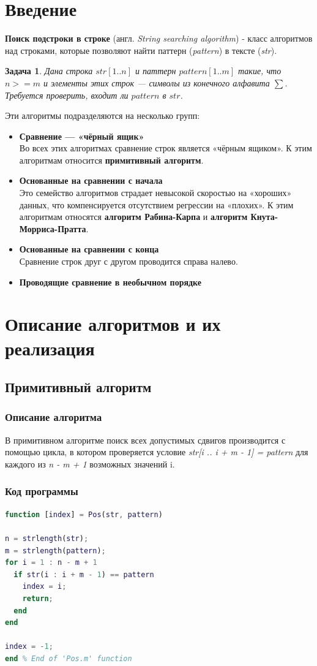 \documentclass[12pt]{article}
\newtheorem{theorem}{Задача}
\begin{document}
\section{Введение}
\textbf{Поиск подстроки в строке} (англ. \textit{String searching algorithm}) -  класс алгоритмов над строками, которые позволяют найти паттерн (\textit{pattern}) в тексте (\textit{str}).
\begin{theorem} \label{task1}
	Дана строка $ str[1 .. n] $ и паттерн $ pattern[1 .. m] $ такие, что $ n >= m $ и элементы этих строк — символы из конечного алфавита $ \sum $. Требуется проверить, входит ли $ pattern $ в $ str $.
\end{theorem}
Эти алгоритмы подразделяются на несколько групп:
\begin{itemize}
	\item \textbf{Сравнение — «чёрный ящик»}\\
	Во всех этих алгоритмах сравнение строк является «чёрным ящиком». К этим алгоритмам относится \textbf{примитивный алгоритм}.
	\item \textbf{Основанные на сравнении с начала}\\
	Это семейство алгоритмов страдает невысокой скоростью на «хороших» данных, что компенсируется отсутствием регрессии на «плохих». К этим алгоритмам относятся \textbf{алгоритм Рабина-Карпа} и \textbf{алгоритм Кнута-Морриса-Пратта}.
	\item \textbf{Основанные на сравнении с конца}\\
	Сравнение строк друг с другом проводится справа налево.
	\item \textbf{Проводящие сравнение в необычном порядке}
\end{itemize}
\section{Описание алгоритмов и их реализация}
\subsection{Примитивный алгоритм}
\subsubsection{Описание алгоритма}
В примитивном алгоритме поиск всех допустимых сдвигов производится с помощью цикла, в котором проверяется условие \textit{str[i .. i + m - 1] = pattern} для каждого из \textit{n - m + 1} возможных значений i.
\subsubsection{Код программы}
\begin{lstlisting}[language={Matlab}, caption={Примитивный алгоритм поиска подстроки в строке}, label={Script}]
function [index] = Pos(str, pattern)

n = strlength(str);
m = strlength(pattern);
for i = 1 : n - m + 1
  if str(i : i + m - 1) == pattern
    index = i;
    return;
  end
end

index = -1;
end % End of 'Pos.m' function
\end{lstlisting}
\end{document}

